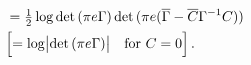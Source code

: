 \documentclass[a4paper,10pt,onecolumn]{article}
\newcommand{\cplx}{\mathbb{C}}
\newcommand{\conj}[1]{\overline{#1}}
\begin{document}
\begin{align}
    &
    = \tfrac12 \log \det{(\pi e \Gamma)}
      \det{(\pi e (\conj{\Gamma} - \conj{C} \Gamma^{-1} C))}
    \notag \\
  \label{eq:cn-proper-entropy}
    &
    \Bigl[
    = \log \bigl\lvert \det{(\pi e \Gamma)} \bigr\rvert
    \quad \text{for } C = 0
    \Bigr]
    \,.
\end{align}
%
\end{document}
